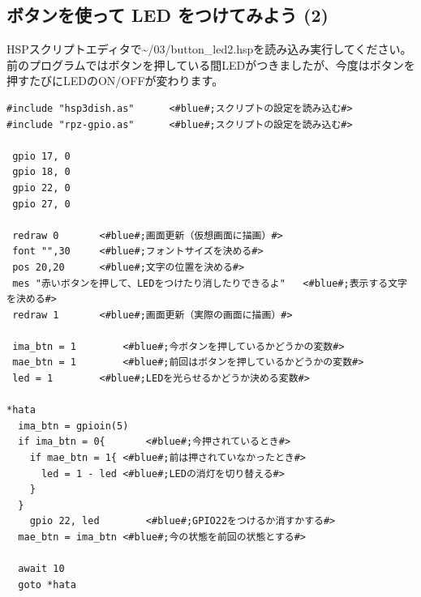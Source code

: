 \subsection{ボタンを使って LED をつけてみよう (2)}
HSPスクリプトエディタで\textasciitilde /03/button\_led2.hspを読み込み実行してください。前のプログラムではボタンを押している間LEDがつきましたが、今度はボタンを押すたびにLEDのON/OFFが変わります。\\

\begin{lstlisting}[caption=button\_led2.hsp,label=button_led2.hsp]
#include "hsp3dish.as"		<#blue#;スクリプトの設定を読み込む#>
#include "rpz-gpio.as"		<#blue#;スクリプトの設定を読み込む#>

 gpio 17, 0
 gpio 18, 0
 gpio 22, 0
 gpio 27, 0
	
 redraw 0		<#blue#;画面更新（仮想画面に描画）#>
 font "",30		<#blue#;フォントサイズを決める#>
 pos 20,20		<#blue#;文字の位置を決める#>
 mes "赤いボタンを押して、LEDをつけたり消したりできるよ"	<#blue#;表示する文字を決める#>
 redraw 1		<#blue#;画面更新（実際の画面に描画）#>

 ima_btn = 1		<#blue#;今ボタンを押しているかどうかの変数#>
 mae_btn = 1		<#blue#;前回はボタンを押しているかどうかの変数#>
 led = 1		<#blue#;LEDを光らせるかどうか決める変数#>

*hata
  ima_btn = gpioin(5)
  if ima_btn = 0{		<#blue#;今押されているとき#>
    if mae_btn = 1{	<#blue#;前は押されていなかったとき#>
      led = 1 - led	<#blue#;LEDの消灯を切り替える#>
    }
  }
    gpio 22, led		<#blue#;GPIO22をつけるか消すかする#>
  mae_btn = ima_btn	<#blue#;今の状態を前回の状態とする#>

  await 10
  goto *hata
\end{lstlisting}

